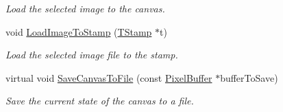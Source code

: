 \begin{DoxyCompactItemize}
\begin{DoxyCompactList}\small\item\em Load the selected image to the canvas. \end{DoxyCompactList}\item 
void \hyperlink{classimage__tools_1_1IOManager_a0e22f92f4e0ede3033a8c67e7b10171a}{Load\+Image\+To\+Stamp} (\hyperlink{classTStamp}{T\+Stamp} $\ast$t)\hypertarget{classimage__tools_1_1IOManager_a0e22f92f4e0ede3033a8c67e7b10171a}{}\label{classimage__tools_1_1IOManager_a0e22f92f4e0ede3033a8c67e7b10171a}

\begin{DoxyCompactList}\small\item\em Load the selected image file to the stamp. \end{DoxyCompactList}\item 
virtual void \hyperlink{classimage__tools_1_1IOManager_a6352ec41ae0eb30ad83e7a092577e6a1}{Save\+Canvas\+To\+File} (const \hyperlink{classimage__tools_1_1PixelBuffer}{Pixel\+Buffer} $\ast$buffer\+To\+Save)\hypertarget{classimage__tools_1_1IOManager_a6352ec41ae0eb30ad83e7a092577e6a1}{}\label{classimage__tools_1_1IOManager_a6352ec41ae0eb30ad83e7a092577e6a1}

\begin{DoxyCompactList}\small\item\em Save the current state of the canvas to a file. \end{DoxyCompactList}\end{DoxyCompactItemize}
